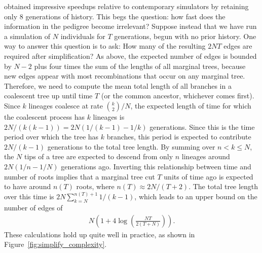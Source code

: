 \documentclass{article}
\begin{document}
\citet{padhukasahasram2008exploring} obtained impressive speedups relative to contemporary simulators
by retaining only 8 generations of history.
This begs the question: how fast does the information in the pedigree become irrelevant?
Suppose instead that we have run a simulation of $N$ individuals for $T$ generations,
begun with no prior history.
One way to answer this question is to ask:
How many of the resulting $2NT$ edges are required after simplification?
As above, the expected number of edges is bounded by $N-2$
plus four times the sum of the lengths of all marginal trees,
because new edges appear with most recombinations that occur on any marginal tree.
Therefore, we need to compute the mean total length of all branches in a coalescent tree
up until time $T$ (or the common ancestor, whichever comes first).
Since $k$ lineages coalesce at rate $\binom{k}{2}/N$,
the expected length of time for which the coalescent process has $k$ lineages is
$2N/(k(k-1)) = 2N(1/(k-1) - 1/k)$ generations.
Since this is the time period over which the tree has $k$ branches,
this period is expected to contribute $2N/(k-1)$ generations to the total tree length.
By summing over $n < k \le N$,
the $N$ tips of a tree are expected to descend from only $n$ lineages
around $2N(1/n - 1/N)$ generations ago.
Inverting this relationship between time and number of roots
implies that a marginal tree cut $T$ units of time ago
is expected to have around $n(T)$ roots, where $n(T) \approx 2N/(T+2)$.
The total tree length over this time is
$2N \sum_{k=N}^{n(T)+1} 1/(k-1)$, which
leads to an upper bound on the number of edges of
\begin{align}
    \label{eqn:edge_bound}
    N \left( 1 + 4 \log\left( \frac{NT}{2(T + N)} \right)\right) .
\end{align}
These calculations hold up quite well in practice,
as shown in Figure~\ref{fig:simplify_complexity}.
\end{document}
